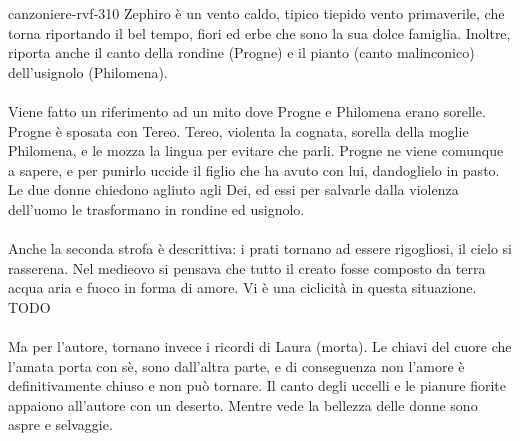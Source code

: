 \documentclass[preview]{standalone}
\begin{document}
\begin{snippet}{canzoniere-rvf-310}
    Zephiro è un vento caldo, tipico tiepido vento primaverile,
    che torna riportando il bel tempo, fiori ed erbe che sono la sua dolce famiglia.
    Inoltre, riporta anche il canto della rondine (Progne) e il pianto (canto malinconico)
    dell'usignolo (Philomena).
    \\\\
    Viene fatto un riferimento ad un mito dove Progne e Philomena erano sorelle.
    Progne è sposata con Tereo. Tereo, violenta la cognata, sorella della moglie Philomena,
    e le mozza la lingua per evitare che parli. Progne ne viene comunque a sapere,
    e per punirlo uccide il figlio che ha avuto con lui, dandoglielo in pasto.
    Le due donne chiedono agliuto agli Dei, ed essi per salvarle dalla violenza dell'uomo
    le trasformano in rondine ed usignolo.
    \\\\
    Anche la seconda strofa è descrittiva: i prati tornano ad essere rigogliosi, il cielo
    si rasserena.
    Nel medieovo si pensava che tutto il creato fosse composto da terra
    acqua aria e fuoco in forma di amore.
    Vi è una ciclicità in questa situazione.
    TODO
    \\\\
    Ma per l'autore, tornano invece i ricordi di Laura (morta).
    Le chiavi del cuore che l'amata porta con sè, sono dall'altra parte, e di conseguenza
    non l'amore è definitivamente chiuso e non può tornare.
    Il canto degli uccelli e le pianure fiorite appaiono all'autore con un deserto.
    Mentre vede la bellezza delle donne sono aspre e selvaggie.
\end{snippet}
\end{document}
